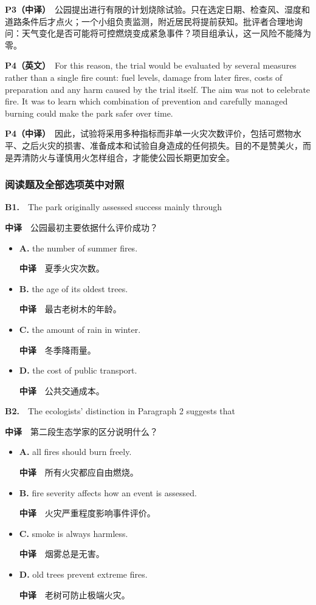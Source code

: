 \documentclass[
  11pt,
]{ctexart}
\begin{document}
\textbf{P3（中译）}　公园提出进行有限的计划烧除试验。只在选定日期、检查风、湿度和道路条件后才点火；一个小组负责监测，附近居民将提前获知。批评者合理地询问：天气变化是否可能将可控燃烧变成紧急事件？项目组承认，这一风险不能降为零。

\textbf{P4（英文）}　For this reason, the trial would be evaluated by
several measures rather than a single fire count: fuel levels, damage
from later fires, costs of preparation and any harm caused by the trial
itself. The aim was not to celebrate fire. It was to learn which
combination of prevention and carefully managed burning could make the
park safer over time.

\textbf{P4（中译）}　因此，试验将采用多种指标而非单一火灾次数评价，包括可燃物水平、之后火灾的损害、准备成本和试验自身造成的任何损失。目的不是赞美火，而是弄清防火与谨慎用火怎样组合，才能使公园长期更加安全。

\subsubsection{阅读题及全部选项英中对照}\label{ux9605ux8bfbux9898ux53caux5168ux90e8ux9009ux9879ux82f1ux4e2dux5bf9ux7167-1}

\textbf{B1.}　The park originally assessed success mainly through

\textbf{中译}　公园最初主要依据什么评价成功？

\begin{itemize}
\item
  \textbf{A.} the number of summer fires.

  \textbf{中译}　夏季火灾次数。
\item
  \textbf{B.} the age of its oldest trees.

  \textbf{中译}　最古老树木的年龄。
\item
  \textbf{C.} the amount of rain in winter.

  \textbf{中译}　冬季降雨量。
\item
  \textbf{D.} the cost of public transport.

  \textbf{中译}　公共交通成本。
\end{itemize}

\textbf{B2.}　The ecologists' distinction in Paragraph 2 suggests that

\textbf{中译}　第二段生态学家的区分说明什么？

\begin{itemize}
\item
  \textbf{A.} all fires should burn freely.

  \textbf{中译}　所有火灾都应自由燃烧。
\item
  \textbf{B.} fire severity affects how an event is assessed.

  \textbf{中译}　火灾严重程度影响事件评价。
\item
  \textbf{C.} smoke is always harmless.

  \textbf{中译}　烟雾总是无害。
\item
  \textbf{D.} old trees prevent extreme fires.

  \textbf{中译}　老树可防止极端火灾。
\end{itemize}
\end{document}
